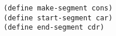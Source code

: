 \documentclass[a4paper,12pt]{article}
\begin{document}
\begin{lstlisting}
(define make-segment cons)
(define start-segment car)
(define end-segment cdr)
\end{lstlisting}
\end{document}
